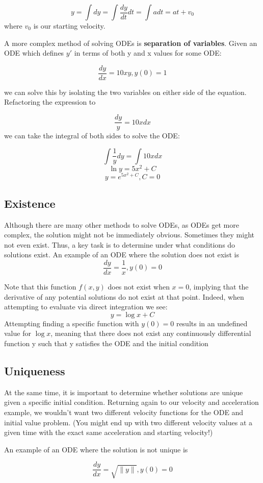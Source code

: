 \documentclass{article}
\begin{document}
$$y = \int dy =  \int \frac{dy}{dt} dt = \int a dt = at + v_0$$
where $v_0$ is our starting velocity.

A more complex method of solving ODEs is \textbf{separation of variables}. Given an ODE which defines $y'$ in terms of both y and x values for some ODE:

$$ \frac{dy}{dx} = 10xy, y(0) = 1$$

we can solve this by isolating the two variables on either side of the equation. Refactoring the expression to

$$  \frac{dy}{y} = 10xdx$$
we can take the integral of both sides to solve the ODE:

$$ \int \frac{1}{y}dy = \int 10x dx $$
$$ \ln y  = 5x^2 + C$$
$$ y = e^{5x^2 + C}, C=0$$

\subsection{Existence}
Although there are many other methods to solve ODEs, as ODEs get more complex, the solution might not be immediately obvious. Sometimes they might not even exist. Thus, a key task is to determine under what conditions do solutions exist. An example of an ODE where the solution does not exist is 
$$ \frac{dy}{dx} = \frac{1}{x}, y(0) = 0$$

Note that this function $f(x,y)$ does not exist when $x = 0$, implying that the derivative of any potential solutions do not exist at that point. Indeed, when attempting to evaluate via direct integration we see:
$$y = \log x +C$$
Attempting finding a specific function with $y(0) = 0$ results in an undefined value for $\log x$, meaning that there does not exist any continuously differential function y such that y satisfies the ODE and the initial condition 

\subsection{Uniqueness}
At the same time, it is important to determine whether solutions are unique given a specific initial condition. Returning again to our velocity and acceleration example, we wouldn't want two different velocity functions for the ODE and initial value problem. (You might end up with two different velocity values at a given time with the exact same acceleration and starting velocity!)

An example of an ODE where the solution is not unique is

$$\frac{dy}{dx} = \sqrt{\|y\|}, y(0) = 0$$
\end{document}
